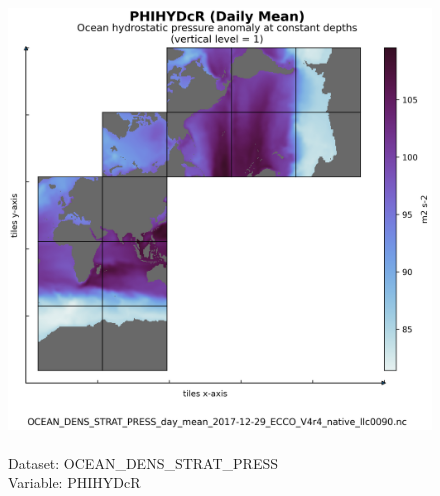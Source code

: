 \begin{figure}[H]
\centering
\includegraphics[scale=0.5]{../images/plots/native_plots/Ocean_Density_Stratification_and_Hydrostatic_Pressure/PHIHYDcR.png}
\caption{\\Dataset: OCEAN\_DENS\_STRAT\_PRESS\\Variable: PHIHYDcR}
\label{tab:table-OCEAN_DENS_STRAT_PRESS_PHIHYDcR-Plot}
\end{figure}
\pagebreak

